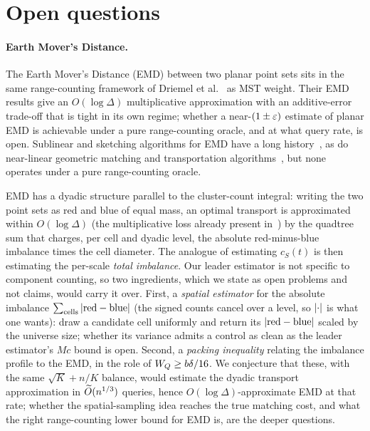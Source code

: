 \section{Open questions}\label{sec:open}

\paragraph{Earth Mover's Distance.}
The Earth Mover's Distance (EMD) between two planar point sets sits in the same range-counting framework of
Driemel et al.~\cite{DMOSW25} as MST weight. Their EMD results give an $O(\log\Delta)$ multiplicative
approximation with an additive-error trade-off that is tight in its own regime; whether a near-$(1\pm\varepsilon)$
estimate of planar EMD is achievable under a pure range-counting oracle, and at what query rate, is open.
Sublinear and sketching algorithms for EMD have a long
history~\cite{AndoniDoBaIndykWoodruff09,DoBaEtal11,Charikar02,AndoniIndykKrauthgamer08}, as do near-linear geometric matching and
transportation algorithms~\cite{AgarwalChangRaghvendraXiao22,AgarwalChangXiao19,SharathkumarAgarwal12,
AgarwalSharathkumar14,KhesinNikolovParamonov19}, but none operates under a pure range-counting oracle.

EMD has a dyadic structure parallel to the cluster-count integral: writing the two point sets as red and
blue of equal mass, an optimal transport is approximated within $O(\log\Delta)$ (the multiplicative loss
already present in~\cite{DMOSW25}) by the quadtree sum that charges, per cell and dyadic level, the
absolute red-minus-blue imbalance times the cell diameter. The analogue of estimating $c_S(t)$ is then
estimating the per-scale \emph{total imbalance}. Our leader estimator is not specific to component
counting, so two ingredients, which we state as open problems and not claims, would carry it over. First, a
\emph{spatial estimator} for the absolute imbalance $\sum_{\text{cells}}\left|\text{red}-\text{blue}\right|$ (the
signed counts cancel over a level, so $\left|\cdot\right|$ is what one wants): draw a candidate cell uniformly and
return its $\left|\text{red}-\text{blue}\right|$ scaled by the universe size; whether its variance admits a
control as clean as the leader estimator's $Mc$ bound is open. Second, a \emph{packing inequality} relating
the imbalance profile to the EMD, in the role of $W_Q\ge b\delta/16$. We conjecture that these, with the
same $\sqrt K+n/K$ balance, would estimate the dyadic transport approximation in $\widetilde{O}(n^{1/3})$ queries,
hence $O(\log\Delta)$-approximate EMD at that rate; whether the spatial-sampling idea reaches the true
matching cost, and what the right
range-counting lower bound for EMD is, are the deeper questions.


